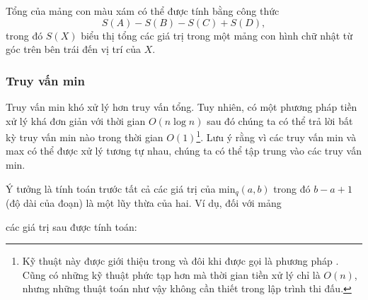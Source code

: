 Tổng của mảng con màu xám có thể được tính
bằng công thức
\[S(A) - S(B) - S(C) + S(D),\]
trong đó $S(X)$ biểu thị tổng các giá trị
trong một mảng con hình chữ nhật
từ góc trên bên trái
đến vị trí của $X$.

\subsubsection{Truy vấn min}


Truy vấn min khó xử lý hơn
truy vấn tổng.
Tuy nhiên, có một phương pháp tiền xử lý
khá đơn giản với thời gian $O(n \log n)$
sau đó chúng ta có thể trả lời bất kỳ truy vấn
min nào trong thời gian $O(1)$\footnote{Kỹ thuật này
được giới thiệu trong \cite{ben00} và đôi khi
được gọi là phương pháp .
Cũng có những kỹ thuật phức tạp hơn \cite{fis06} mà
thời gian tiền xử lý chỉ là $O(n)$, nhưng những thuật toán
như vậy không cần thiết trong lập trình thi đấu.}.
Lưu ý rằng vì các truy vấn min và max có thể
được xử lý tương tự nhau,
chúng ta có thể tập trung vào các truy vấn min.

Ý tưởng là tính toán trước tất cả các giá trị của
$\textrm{min}_q(a,b)$ trong đó
$b-a+1$ (độ dài của đoạn) là một lũy thừa của hai.
Ví dụ, đối với mảng

\begin{center}
\end{center}
các giá trị sau được tính toán:


